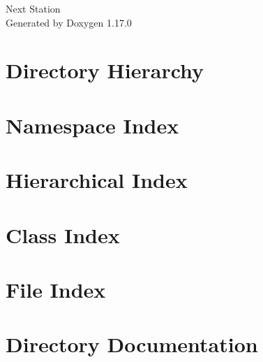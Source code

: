\documentclass[twoside]{book}
\newcommand{\+}{\discretionary{\mbox{\scriptsize$\hookleftarrow$}}{}{}}
\newcommand{\clearemptydoublepage}{%
    \newpage{\pagestyle{empty}\cleardoublepage}%
  }
\begin{document}
  \raggedbottom
    \hypersetup{pageanchor=false,
                bookmarksnumbered=true,
                pdfencoding=unicode
               }
  \begin{titlepage}
  \vspace*{7cm}
  \begin{center}%
  {\Large Next Station}\\
  \vspace*{1cm}
  {\large Generated by Doxygen 1.17.0}\\
  \end{center}
  \end{titlepage}
  \clearemptydoublepage
  \tableofcontents
  \clearemptydoublepage
  \hypersetup{pageanchor=true}
\chapter{Directory Hierarchy}

\chapter{Namespace Index}

\chapter{Hierarchical Index}

\chapter{Class Index}

\chapter{File Index}

\chapter{Directory Documentation}










\end{document}
